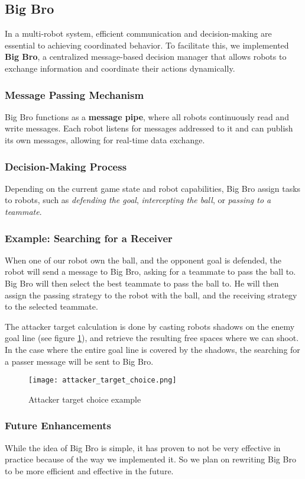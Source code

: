 \subsection{Big Bro}

In a multi-robot system, efficient communication and decision-making are essential to achieving coordinated behavior. To facilitate this, we implemented \textbf{Big Bro}, a centralized message-based decision manager that allows robots to exchange information and coordinate their actions dynamically.  

\subsubsection{Message Passing Mechanism}

Big Bro functions as a \textbf{message pipe}, where all robots continuously read and write messages. Each robot listens for messages addressed to it and can publish its own messages, allowing for real-time data exchange.

\subsubsection{Decision-Making Process}

Depending on the current game state and robot capabilities, Big Bro assign tasks to robots, such as \textit{defending the goal}, \textit{intercepting the ball}, or \textit{passing to a teammate}.

\subsubsection{Example: Searching for a Receiver}

When one of our robot own the ball, and the opponent goal is defended, the robot will send a message to Big Bro, asking for a teammate to pass the ball to. Big Bro will then select the best teammate to pass the ball to. He will then assign the passing strategy to the robot with the ball, and the receiving strategy to the selected teammate.

The attacker target calculation is done by casting robots shadows on the enemy goal line (see figure \ref{fig:attacker_target_choice}), and retrieve the resulting free spaces where we can shoot.
In the case where the entire goal line is covered by the shadows, the searching for a passer message will be sent to Big Bro.
\begin{figure}
\centering
    \texttt{[image: attacker\_target\_choice.png]}
    \caption{Attacker target choice example}
    \label{fig:attacker_target_choice}
\end{figure}

\subsubsection{Future Enhancements}

While the idea of Big Bro is simple, it has proven to not be very effective in practice because of the way we implemented it. So we plan on rewriting Big Bro to be more efficient and effective in the future.